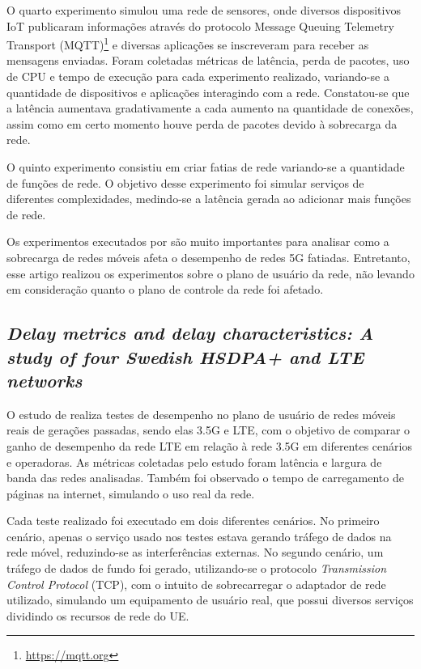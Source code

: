 O quarto experimento simulou uma rede de sensores, onde diversos dispositivos IoT publicaram informações através do protocolo Message Queuing Telemetry Transport (MQTT)\footnote{\url{https://mqtt.org}} e diversas aplicações se inscreveram para receber as mensagens enviadas.
Foram coletadas métricas de latência, perda de pacotes, uso de CPU e tempo de execução para cada experimento realizado, variando-se a quantidade de dispositivos e aplicações interagindo com a rede.
Constatou-se que a latência aumentava gradativamente a cada aumento na quantidade de conexões, assim como em certo momento houve perda de pacotes devido à sobrecarga da rede.

O quinto experimento consistiu em criar fatias de rede variando-se a quantidade de funções de rede.
O objetivo desse experimento foi simular serviços de diferentes complexidades, medindo-se a latência gerada ao adicionar mais funções de rede.

Os experimentos executados por \cite{Lee2021} são muito importantes para analisar como a sobrecarga de redes móveis afeta o desempenho de redes 5G fatiadas.
Entretanto, esse artigo realizou os experimentos sobre o plano de usuário da rede, não levando em consideração quanto o plano de controle da rede foi afetado.

\subsection{\textit{Delay metrics and delay characteristics: A study of four Swedish HSDPA+ and LTE networks}}

O estudo de \cite{Garcia2015} realiza testes de desempenho no plano de usuário de redes móveis reais de gerações passadas, sendo elas 3.5G e LTE, com o objetivo de comparar o ganho de desempenho da rede LTE em relação à rede 3.5G em diferentes cenários e operadoras.
As métricas coletadas pelo estudo foram latência e largura de banda das redes analisadas.
Também foi observado o tempo de carregamento de páginas na internet, simulando o uso real da rede.

Cada teste realizado foi executado em dois diferentes cenários.
No primeiro cenário, apenas o serviço usado nos testes estava gerando tráfego de dados na rede móvel, reduzindo-se as interferências externas.
No segundo cenário, um tráfego de dados de fundo foi gerado, utilizando-se o protocolo \textit{Transmission Control Protocol} (TCP), com o intuito de sobrecarregar o adaptador de rede utilizado, simulando um equipamento de usuário real, que possui diversos serviços dividindo os recursos de rede do UE.


